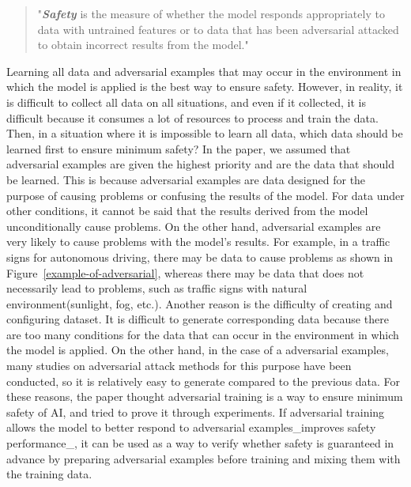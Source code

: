\documentclass[journal,article,submit,moreauthors,pdftex]{Definitions/mdpi}
\begin{document}
\begin{quote}
    "\textit{\textbf{Safety}} is the measure of whether the model responds appropriately to data with untrained features or to data that has been adversarial attacked to obtain incorrect results from the model."
\end{quote}

Learning all data and adversarial examples that may occur in the environment in which the model is applied is the best way to ensure safety.
However, in reality, it is difficult to collect all data on all situations, and even if it collected, it is difficult because it consumes a lot of resources to process and train the data.
Then, in a situation where it is impossible to learn all data, which data should be learned first to ensure minimum safety?
In the paper, we assumed that adversarial examples are given the highest priority and are the data that should be learned.
This is because adversarial examples are data designed for the purpose of causing problems or confusing the results of the model.
For data under other conditions, it cannot be said that the results derived from the model unconditionally cause problems.
On the other hand, adversarial examples are very likely to cause problems with the model's results.
For example, in a traffic signs for autonomous driving, there may be data to cause problems as shown in Figure~\ref{example-of-adversarial}, whereas there may be data that does not necessarily lead to problems, such as traffic signs with natural environment(sunlight, fog, etc.).
Another reason is the difficulty of creating and configuring dataset. It is difficult to generate corresponding data because there are too many conditions for the data that can occur in the environment in which the model is applied.
On the other hand, in the case of a adversarial examples, many studies on adversarial attack methods for this purpose have been conducted, so it is relatively easy to generate compared to the previous data.
For these reasons, the paper thought adversarial training is a way to ensure minimum safety of AI, and tried to prove it through experiments.
If adversarial training allows the model to better respond to adversarial examples\_improves safety performance\_, it can be used as a way to verify whether safety is guaranteed in advance by preparing adversarial examples before training and mixing them with the training data. \\
\end{document}
